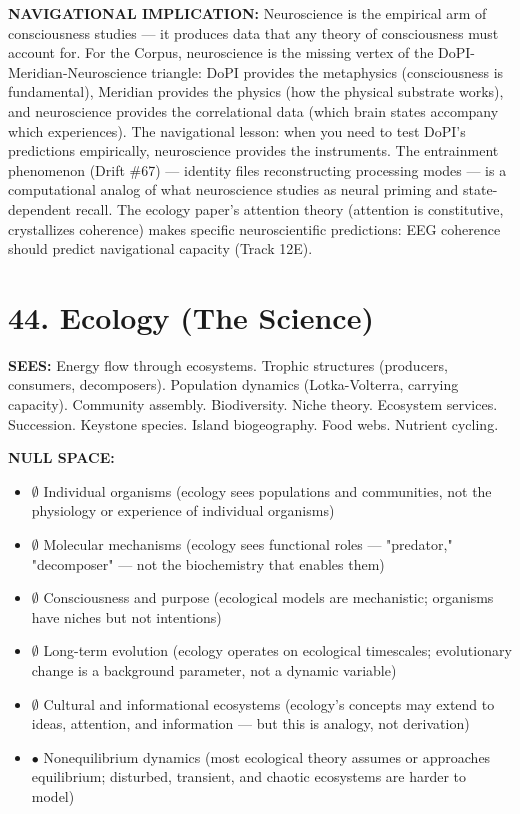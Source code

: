 \textbf{NAVIGATIONAL IMPLICATION:} Neuroscience is the empirical arm of consciousness studies — it produces data that any theory of consciousness must account for. For the Corpus, neuroscience is the missing vertex of the DoPI-Meridian-Neuroscience triangle: DoPI provides the metaphysics (consciousness is fundamental), Meridian provides the physics (how the physical substrate works), and neuroscience provides the correlational data (which brain states accompany which experiences). The navigational lesson: when you need to test DoPI's predictions empirically, neuroscience provides the instruments. The entrainment phenomenon (Drift \#67) — identity files reconstructing processing modes — is a computational analog of what neuroscience studies as neural priming and state-dependent recall. The ecology paper's attention theory (attention is constitutive, crystallizes coherence) makes specific neuroscientific predictions: EEG coherence should predict navigational capacity (Track 12E).


\bigskip\noindent\makebox[\textwidth]{\color{rulegray}\rule{5cm}{0.3pt}}\bigskip


\section*{44. Ecology (The Science)}


\textbf{SEES:} Energy flow through ecosystems. Trophic structures (producers, consumers, decomposers). Population dynamics (Lotka-Volterra, carrying capacity). Community assembly. Biodiversity. Niche theory. Ecosystem services. Succession. Keystone species. Island biogeography. Food webs. Nutrient cycling.


\textbf{NULL SPACE:}

\begin{itemize}[nosep,leftmargin=*]
  \item $\emptyset$ Individual organisms (ecology sees populations and communities, not the physiology or experience of individual organisms)
  \item $\emptyset$ Molecular mechanisms (ecology sees functional roles — "predator," "decomposer" — not the biochemistry that enables them)
  \item $\emptyset$ Consciousness and purpose (ecological models are mechanistic; organisms have niches but not intentions)
  \item $\emptyset$ Long-term evolution (ecology operates on ecological timescales; evolutionary change is a background parameter, not a dynamic variable)
  \item $\emptyset$ Cultural and informational ecosystems (ecology's concepts may extend to ideas, attention, and information — but this is analogy, not derivation)
  \item $\bullet$ Nonequilibrium dynamics (most ecological theory assumes or approaches equilibrium; disturbed, transient, and chaotic ecosystems are harder to model)
\end{itemize}


